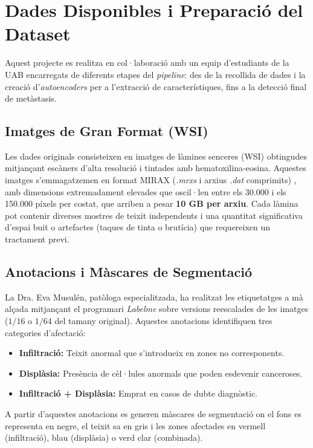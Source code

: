 ﻿\documentclass[10pt,a4paper,twocolumn,twoside]{article}
\begin{document}
\section{Dades Disponibles i Preparació del Dataset}

Aquest projecte es realitza en col·laboració amb un equip d'estudiants de la UAB encarregats de diferents etapes del \textit{pipeline}: des de la recollida de dades i la creació d'\textit{autoencoders} per a l'extracció de característiques, fins a la detecció final de metàstasis.

\subsection{Imatges de Gran Format (WSI)}

Les dades originals consisteixen en imatges de làmines senceres (WSI) obtingudes mitjançant escàners d'alta resolució i tintades amb hematoxilina-eosina. Aquestes imatges s'emmagatzemen en format MIRAX (\textit{.mrxs} i arxius \textit{.dat} comprimits) , amb dimensions extremadament elevades que oscil·len entre els 30.000 i els 150.000 píxels per costat, que arriben a pesar \textbf{10 GB per arxiu}. Cada làmina pot contenir diverses mostres de teixit independents i una quantitat significativa d'espai buit o artefactes (taques de tinta o brutícia) que requereixen un tractament previ.

\subsection{Anotacions i Màscares de Segmentació}

La Dra. Eva Musulén, patòloga especialitzada, ha realitzat les etiquetatges a mà alçada mitjançant el programari \textit{Labelme} sobre versions reescalades de les imatges ($1/16$ o $1/64$ del tamany original). Aquestes anotacions identifiquen tres categories d'afectació:

\begin{itemize}
    \item \textbf{Infiltració:} Teixit anormal que s'introdueix en zones no corresponents.
    \item \textbf{Displàsia:} Presència de cèl·lules anormals que poden esdevenir canceroses.
    \item \textbf{Infiltració + Displàsia:} Emprat en casos de dubte diagnòstic.
\end{itemize}

A partir d'aquestes anotacions es generen màscares de segmentació on el fons es representa en negre, el teixit sa en gris i les zones afectades en vermell (infiltració), blau (displàsia) o verd clar (combinada).
\end{document}
